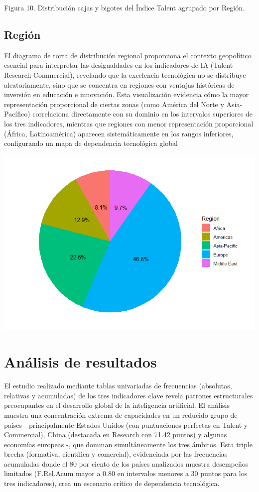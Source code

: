 \documentclass[
]{article}
\begin{document}
\begin{multicols}{2}
Figura 10. Distribución cajas y bigotes del Índice Talent agrupado por Región.


\subsection{Región}
El diagrama de torta de distribución regional proporciona el contexto geopolítico esencial para interpretar las desigualdades en los indicadores de IA (Talent-Research-Commercial), revelando que la excelencia tecnológica no se distribuye aleatoriamente, sino que se concentra en regiones con ventajas históricas de inversión en educación e innovación. Esta visualización evidencia cómo la mayor representación proporcional de ciertas zonas (como América del Norte y Asia-Pacífico) correlaciona directamente con su dominio en los intervalos superiores de los tres indicadores, mientras que regiones con menor representación proporcional (África, Latinoamérica) aparecen sistemáticamente en los rangos inferiores, configurando un mapa de dependencia tecnológica global

\includegraphics[width=\linewidth]{Efrain(torta).png}


\section{Análisis de resultados}
El estudio realizado mediante tablas univariadas de frecuencias (absolutas, relativas y acumuladas) de los tres indicadores clave revela patrones estructurales preocupantes en el desarrollo global de la inteligencia artificial. El análisis muestra una concentración extrema de capacidades en un reducido grupo de países - principalmente Estados Unidos (con puntuaciones perfectas en Talent y Commercial), China (destacada en Research con 71.42 puntos) y algunas economías europeas -, que dominan simultáneamente los tres ámbitos. Esta triple brecha (formativa, científica y comercial), evidenciada por las frecuencias acumuladas donde el 80 por ciento de los países analizados muestra desempeños limitados (F.Rel.Acum mayor a 0.80 en intervalos menores a 30 puntos para los tres indicadores), crea un escenario crítico de dependencia tecnológica.


\end{multicols}
\end{document}
